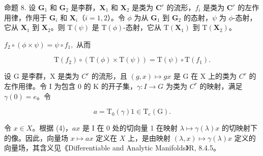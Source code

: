 命题 8. 设 \(\mathbf{G}_1\) 和 \(\mathbf{G}_2\) 是李群，\(\mathbf{X}_1\) 和 \(\mathbf{X}_2\) 是类为 \(\mathbf{C}^r\) 的流形，\(f_i\) 是类为 \(\mathbf{C}^r\) 的左作用律，作用于 \(\mathbf{G}_i\) 和 \(\mathbf{X}_i\)（\(i = 1, 2\)）。令 \(\phi\) 为从 \(\mathbf{G}_1\) 到 \(\mathbf{G}_2\) 的态射，\(\psi\) 为 \(\phi\)-态射，它从 \(\mathbf{X}_1\) 到 \(\mathbf{X}_2\)。则 \(\mathrm{T}(\psi)\) 是 \(\mathrm{T}(\phi)\)-态射，它从 \(\mathrm{T}(\mathbf{X}_1)\) 到 \(\mathrm{T}(\mathbf{X}_2)\)。

\(f_{2}\circ (\phi \times \psi) = \psi \circ f_{1},\) 从而

\[
\mathrm{T} (f _ {2}) \circ (\mathrm{T} (\phi) \times \mathrm{T} (\psi)) = \mathrm{T} (\psi) \circ \mathrm{T} (f _ {1}).
\]

设 G 是李群，X 是类为 \(C^{r}\) 的流形，且 \((g, x) \mapsto gx\) 是 G 在 X 上的类为 \(C^{r}\) 的左作用律。令 I 为包含 0 的 K 的开子集，\(\gamma: I \to G\) 为类为 \(C^{r}\) 的映射，满足 \(\gamma(0) = e\)。令

\[
a = \mathrm{T} _ {0} (\gamma) 1 \in \mathrm{T} _ {e} (\mathrm{G}).
\]

令 \(x \in X\)。根据 (4)，\(ax\) 是 I 在 0 处的切向量 1 在映射 \(\lambda \mapsto \gamma(\lambda)x\) 的切映射下的像。因此，向量场 \(x \mapsto ax\) 定义在 \(X\) 上，是由映射 \((\lambda, x) \mapsto \gamma(\lambda)x\) 定义的向量场，其含义见《Differentiable and Analytic Manifolds》R, 8.4.5。
\relax{}
